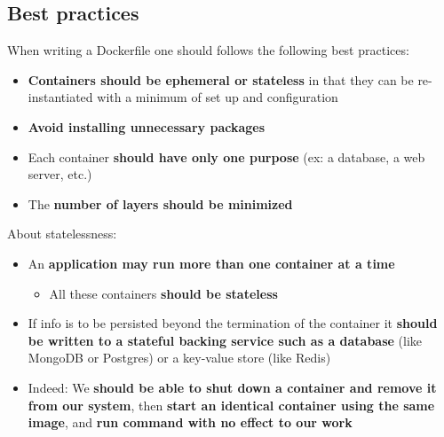 \documentclass[handout]{beamer}[10pt, usepdftitle=false]
\begin{document}
	\subsection{Best practices}
	\begin{frame}
	
	When writing a Dockerfile one should follows the following best practices:
	\vspace*{0.6em}
	
	\begin{itemize}
	\item{\textbf{Containers should be ephemeral or stateless} in that they can be re-instantiated with a minimum of set up and configuration}
	\item{\textbf{Avoid installing unnecessary packages}}
	\item{Each container \textbf{should have only one purpose} (ex: a database, a web server, etc.)}
	\item{The \textbf{number of layers should be minimized}}
	\end{itemize}	

	\end{frame}


	\begin{frame}

	About statelessness:
	\vspace*{0.6em}

	\begin{itemize}
	\item{An \textbf{application may run more than one container at a time}
		\begin{itemize}
			\item{All these containers \textbf{should be stateless}}
		\end{itemize}			
	}
	\item{If info is to be persisted beyond the termination of the container it \textbf{should be written to a stateful backing service such as a database} (like MongoDB or Postgres) or a key-value store (like Redis)}
	\item{Indeed: We \textbf{should be able to shut down a container and remove it from our system}, then \textbf{start an identical container using the same image}, and \textbf{run command with no effect to our work}}
\end{itemize}		 

	\end{frame}
\end{document}
